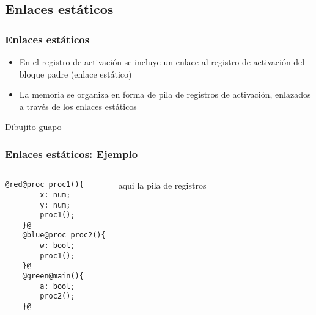 \documentclass[hyperref={pdfpagelabels=false},tree-dvips]{beamer}
\begin{document}
\subsection{Enlaces estáticos}
\begin{frame}[fragile]
\frametitle{Enlaces estáticos}
\begin{itemize}%
	\item En el registro de activación se incluye un enlace al registro de activación del bloque padre (enlace estático)
	\item La memoria se organiza en forma de pila de registros de activación, enlazados a través de los enlaces estáticos
\end{itemize}

Dibujito guapo

\end{frame}
\begin{frame}[fragile] %
\frametitle{Enlaces estáticos: Ejemplo}

\begin{columns}[T]
	\begin{lstlisting}[style=procesos]
	@red@proc proc1(){
	    x: num;
	    y: num;
	    proc1();
	}@
	@blue@proc proc2(){
	    w: bool;
	    proc1();
	}@
	@green@main(){
	    a: bool;
	    proc2();
	}@
	\end{lstlisting}
	aqui la pila de registros
\end{columns}

\end{frame}
\end{document}
